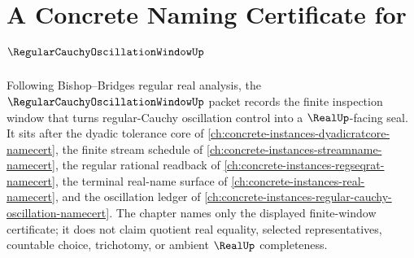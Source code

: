 \chapter{A Concrete Naming Certificate for $\RegularCauchyOscillationWindowUp$}
\label{ch:concrete-instances-regular-cauchy-oscillation-window-namecert}

Following Bishop--Bridges regular real analysis, the $\RegularCauchyOscillationWindowUp$ packet records the finite inspection window that turns regular-Cauchy oscillation control into a $\RealUp$-facing seal. It sits after the dyadic tolerance core of \autoref{ch:concrete-instances-dyadicratcore-namecert}, the finite stream schedule of \autoref{ch:concrete-instances-streamname-namecert}, the regular rational readback of \autoref{ch:concrete-instances-regseqrat-namecert}, the terminal real-name surface of \autoref{ch:concrete-instances-real-namecert}, and the oscillation ledger of \autoref{ch:concrete-instances-regular-cauchy-oscillation-namecert}. The chapter names only the displayed finite-window certificate; it does not claim quotient real equality, selected representatives, countable choice, trichotomy, or ambient $\RealUp$ completeness.

